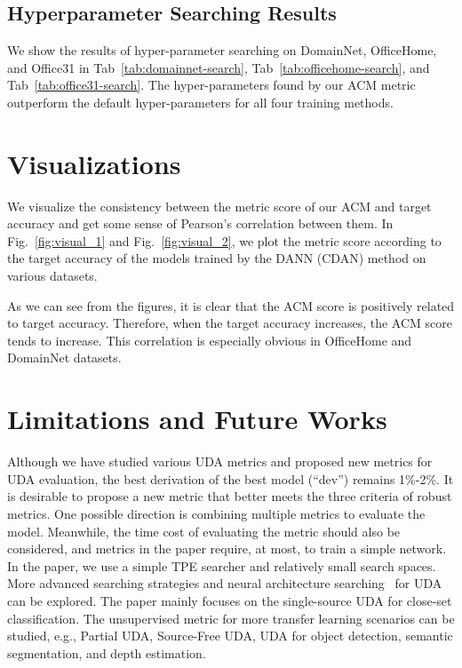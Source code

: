 \subsection{Hyperparameter Searching Results}

We show the results of hyper-parameter searching on DomainNet, OfficeHome, and Office31 in Tab~\ref{tab:domainnet-search}, Tab~\ref{tab:officehome-search}, and Tab~\ref{tab:office31-search}. The hyper-parameters found by our ACM metric outperform the default hyper-parameters for all four training methods.

\section{Visualizations}

We visualize the consistency between the metric score of our ACM and target accuracy and get some sense of Pearson's correlation between them. In Fig.~\ref{fig:visual_1} and Fig.~\ref{fig:visual_2}, we plot the metric score according to the target accuracy of the models trained by the DANN (CDAN) method on various datasets.

As we can see from the figures, it is clear that the ACM score is positively related to target accuracy. Therefore, when the target accuracy increases, the ACM score tends to increase. This correlation is especially obvious in OfficeHome and DomainNet datasets. %


\section{Limitations and Future Works}

Although we have studied various UDA metrics and proposed new metrics for UDA evaluation, the best derivation of the best model (``dev'') remains 1\%-2\%. It is desirable to propose a new metric that better meets the three criteria of robust metrics. One possible direction is combining multiple metrics to evaluate the model. Meanwhile, the time cost of evaluating the metric should also be considered, and metrics in the paper require, at most, to train a simple network. 
In the paper, we use a simple TPE searcher and relatively small search spaces. More advanced searching strategies and neural architecture searching~\cite{NAS} for UDA can be explored. The paper mainly focuses on the single-source UDA for close-set classification. The unsupervised metric for more transfer learning scenarios can be studied, e.g., Partial UDA, Source-Free UDA, UDA for object detection, semantic segmentation, and depth estimation.